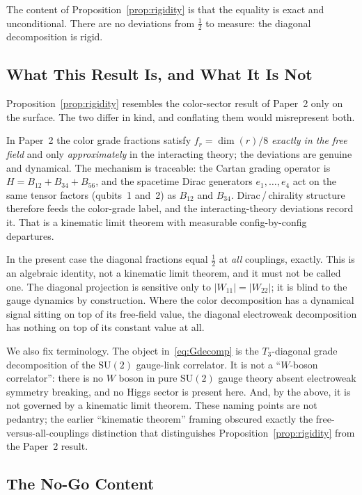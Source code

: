 \documentclass[12pt]{article}
\theoremstyle{remark}
\newcommand{\su}{\mathrm{SU}}
\newcommand{\half}{\tfrac{1}{2}}
\begin{document}
The content of Proposition~\ref{prop:rigidity} is that the equality is exact and
unconditional.  There are no deviations from $\half$ to measure: the diagonal
decomposition is rigid.

\subsection{What This Result Is, and What It Is Not}
\label{sec:rigidity-contrast}

Proposition~\ref{prop:rigidity} resembles the color-sector result of Paper~2
only on the surface.  The two differ in kind, and conflating them would
misrepresent both.

In Paper~2 the color grade fractions satisfy $f_r=\dim(r)/8$ \emph{exactly in
the free field} and only \emph{approximately} in the interacting theory; the
deviations are genuine and dynamical.  The mechanism is traceable: the Cartan
grading operator is $H=B_{12}+B_{34}+B_{56}$, and the spacetime Dirac generators
$e_1,\ldots,e_4$ act on the same tensor factors (qubits~1 and~2) as $B_{12}$ and
$B_{34}$.  Dirac\,/\,chirality structure therefore feeds the color-grade label,
and the interacting-theory deviations record it.  That is a kinematic limit
theorem with measurable config-by-config departures.

In the present case the diagonal fractions equal $\half$ at \emph{all}
couplings, exactly.  This is an algebraic identity, not a kinematic limit
theorem, and it must not be called one.  The diagonal projection is sensitive
only to $|W_{11}|=|W_{22}|$; it is blind to the gauge dynamics by construction.
Where the color decomposition has a dynamical signal sitting on top of its
free-field value, the diagonal electroweak decomposition has nothing on top of
its constant value at all.

We also fix terminology.  The object in~\eqref{eq:Gdecomp} is the $T_3$-diagonal
grade decomposition of the $\su(2)$ gauge-link correlator.  It is not a
``$W$-boson correlator'': there is no $W$ boson in pure $\su(2)$ gauge theory
absent electroweak symmetry breaking, and no Higgs sector is present here.  And,
by the above, it is not governed by a kinematic limit theorem.  These naming
points are not pedantry; the earlier ``kinematic theorem'' framing obscured
exactly the free-versus-all-couplings distinction that distinguishes
Proposition~\ref{prop:rigidity} from the Paper~2 result.

\subsection{The No-Go Content}
\label{sec:rigidity-nogo}
\end{document}
